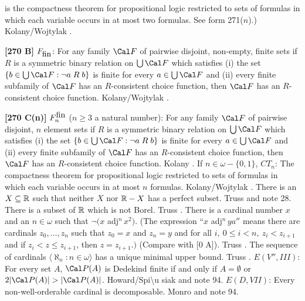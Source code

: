 is the compactness theorem for propositional logic restricted to sets of
formulas in which each variable occurs in at most two formulas.
See form 271($n$).)  \ac{Kolany/Wojtylak} \cite{1991}.
\smallskip
\item{}{\bf [270 B]} $F_{\hbox{fin}}$:  For any family ${\Cal F}$  of
pairwise disjoint, non-empty, finite sets if $R$ is a symmetric binary
relation on $\bigcup {\Cal F}$ which satisfies (i) the set $\{b\in\bigcup
{\Cal F}: \neg a\mathrel R b\}$ is finite for every $a\in\bigcup{\Cal F}$
and (ii) every finite subfamily of ${\Cal F}$ has an $R$-consistent
choice function, then ${\Cal F}$ has an $R$-consistent
choice function.  \ac{Kolany/Wojtylak} \cite{1991}.
\smallskip
\item{}{\bf [270 C(n)]}  $F^{\hbox{fin}}_n$ ($n\ge 3$ a natural number):
For any family ${\Cal F}$ of pairwise disjoint,
$n$ element sets if $R$ is a symmetric binary relation on
$\bigcup {\Cal F}$ which satisfies (i) the set $\{ b\in \bigcup
{\Cal F} : \neg a\mathrel R b\}$ is finite
for every $a \in \bigcup {\Cal F}$ and (ii) every finite subfamily of
${\Cal F}$ has an $R$-consistent choice function, then
${\Cal F}$ has an $R$-consistent choice function. \ac{Kolany} \cite{1992}.
\medskip
{} If $n\in\omega-\{0,1\}$, $CT_{n}$:
The compactness theorem for propositional logic restricted to sets
of formulas in which each variable occurs in at most $n$ formulas.
\ac{Kolany/Wojtylak} \cite{1991}.
\medskip
{} There is an $X\subseteq{\Bbb R}$ such that
neither $X$ nor $\Bbb R - X$ has a perfect subset.
\ac{Truss} \cite{1974b} and note 28.
\medskip
{} There is a subset of ${\Bbb R}$ which is not
Borel. \ac{Truss} \cite{1974b}.
\medskip
{} There is a cardinal number $x$ and an $n\in\omega$
such that $\neg(x$ adj$^n\, x^2)$. (The expression ``$x$ adj$^n\, ya''$
means there are cardinals $z_0,\ldots, z_n$ such that $z_0 = x$ and
$z_n = y$ and for all $i,\ 0\le i < n,\ z_i< z_{i+1}$ and if  $z_i < z\le
z_{i+1}$, then $z = z_{i+1}.)$ (Compare with [0 A]). \ac{Truss}
\cite{1974b}.
\medskip
{} The sequence of cardinals $\langle\aleph_n: n
\in\omega\rangle$ has a unique minimal upper bound.  \ac{Truss}
\cite{1974b}.
\medskip
{} $E(V'',III)$: For every set $A$, ${\Cal P}(A)$ is
Dedekind finite if and only if $A = \emptyset$  or $2|{\Cal P}(A)| >
|{\Cal P}(A)|$. \ac{Howard/Spi\u siak} \cite{1994} and note 94.
\medskip
{} $E(D,VII)$: Every non-well-orderable cardinal is
decomposable. \ac{Monro} \cite{1973a} and note 94.
